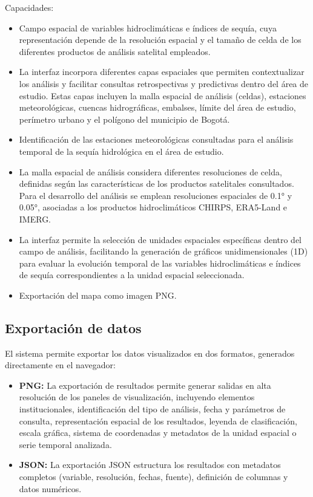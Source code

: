 Capacidades:
\begin{itemize}
    \item Campo espacial de variables hidroclimáticas e índices de sequía, cuya representación depende de la resolución espacial y el tamaño de celda de los diferentes productos de análisis satelital empleados.
    \item La interfaz incorpora diferentes capas espaciales que permiten contextualizar los análisis y facilitar consultas retrospectivas y predictivas dentro del área de estudio. Estas capas incluyen la malla espacial de análisis (celdas), estaciones meteorológicas, cuencas hidrográficas, embalses, límite del área de estudio, perímetro urbano y el polígono del municipio de Bogotá.
    \item Identificación de las estaciones meteorológicas consultadas para el análisis temporal de la sequía hidrológica en el área de estudio.
    \item La malla espacial de análisis considera diferentes resoluciones de celda, definidas según las características de los productos satelitales consultados. Para el desarrollo del análisis se emplean resoluciones espaciales de 0.1° y 0.05°, asociadas a los productos hidroclimáticos CHIRPS, ERA5-Land e IMERG.
    \item La interfaz permite la selección de unidades espaciales específicas dentro del campo de análisis, facilitando la generación de gráficos unidimensionales (1D) para evaluar la evolución temporal de las variables hidroclimáticas e índices de sequía correspondientes a la unidad espacial seleccionada.
    \item Exportación del mapa como imagen PNG.
\end{itemize}

\subsection{Exportación de datos}
\label{subsec:exportacion}

El sistema permite exportar los datos visualizados en dos formatos, generados directamente en el navegador:

\begin{itemize}
    \item \textbf{PNG:} La exportación de resultados permite generar salidas en alta resolución de los paneles de visualización, incluyendo elementos institucionales, identificación del tipo de análisis, fecha y parámetros de consulta, representación espacial de los resultados, leyenda de clasificación, escala gráfica, sistema de coordenadas y metadatos de la unidad espacial o serie temporal analizada.
    \item \textbf{JSON:} La exportación JSON estructura los resultados con metadatos completos (variable, resolución, fechas, fuente), definición de columnas y datos numéricos.
\end{itemize}

